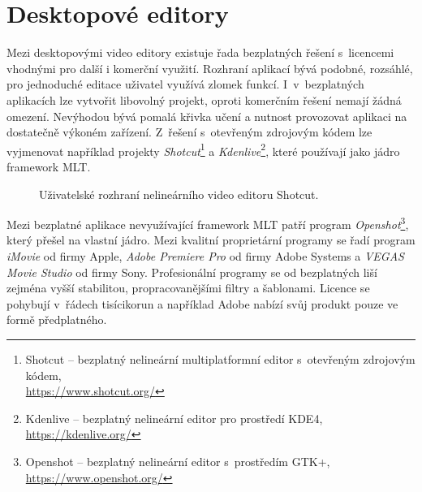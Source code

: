 \section{Desktopové editory}
Mezi desktopovými video editory existuje řada bezplatných řešení s~licencemi vhodnými pro další i komerční využití. Rozhraní aplikací bývá podobné, rozsáhlé, pro jednoduché editace uživatel využívá zlomek funkcí. I~v~bezplatných aplikacích lze vytvořit libovolný projekt, oproti komerčním řešení nemají žádná omezení. Nevýhodou bývá pomalá křivka učení a nutnost provozovat aplikaci na dostatečně výkoném zařízení. Z~řešení s~otevřeným zdrojovým kódem lze vyjmenovat například projekty \textit{Shotcut}\footnote{Shotcut -- bezplatný nelineární multiplatformní editor s~otevřeným zdrojovým kódem,\\\url{https://www.shotcut.org/}} a \textit{Kdenlive}\footnote{Kdenlive -- bezplatný nelineární editor pro prostředí KDE4, \url{https://kdenlive.org/}}, které používají jako jádro framework MLT.
\begin{figure}[ht]
	\centering
	\caption{Uživatelské rozhraní nelineárního video editoru Shotcut. }\label{img:shotcut}
\end{figure}
Mezi bezplatné aplikace nevyužívající framework MLT patří program \textit{Openshot}\footnote{Openshot -- bezplatný nelineární editor s~prostředím GTK+, \url{https://www.openshot.org/}}, který přešel na vlastní jádro. Mezi kvalitní proprietární programy se řadí program \textit{iMovie} od firmy Apple, \textit{Adobe Premiere Pro} od firmy Adobe Systems a \textit{ VEGAS Movie Studio} od firmy Sony. Profesionální programy se od bezplatných liší zejména vyšší stabilitou, propracovanějšími filtry a šablonami. Licence se pohybují v~řádech tisícikorun a například Adobe nabízí svůj produkt pouze ve formě předplatného.

